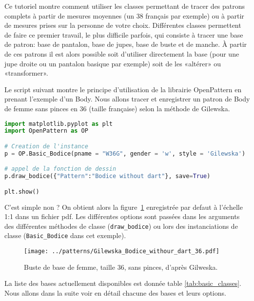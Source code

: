 \documentclass[10pt,a4paper,twoside]{report}
\begin{document}
Ce tutoriel montre comment utiliser les classes permettant de tracer des patrons complets à partir de mesures moyennes (un 38 français par exemple) ou à partir de mesures prises sur la personne de votre choix.
Différentes classes permettent de faire ce premier travail, le plus difficile parfois, qui consiste à tracer une base de patron:  base de pantalon, base de jupes, base de buste et de manche. À partir de ces patrons  il est alors  possible soit d'utiliser directement la base (pour une jupe droite ou un pantalon basique par exemple) soit de les «altérer» ou «transformer».

Le script suivant montre le principe d'utilisation de la librairie OpenPattern en prenant l'exemple d'un Body.  Nous allons tracer et enregistrer un patron de Body de femme sans pinces en 36 (taille française) selon la méthode de Gilewska.

\begin{lstlisting}[language=python]
import matplotlib.pyplot as plt
import OpenPattern as OP

# Creation de l'instance
p = OP.Basic_Bodice(pname = "W36G", gender = 'w', style = 'Gilewska')

# appel de la fonction de dessin
p.draw_bodice({"Pattern":"Bodice without dart"}, save=True)

plt.show()
\end{lstlisting}

C'est simple non ? On obtient alors la figure~\ref{fig:bodice_WG36} enregistrée par defaut à l'échelle 1:1 dans un fichier pdf. Les différentes options sont passées dans les arguments des différentes méthodes de classe (\texttt{draw\_bodice}) ou lors des instanciations de classe (\texttt{Basic\_Bodice} dans cet exemple).



\begin{figure}[hbtp]
\centering
\texttt{[image: ../patterns/Gilewska\_Bodice\_withour\_dart\_36.pdf]}
\caption{Buste de base de femme, taille 36, sans pinces, d'après Gilweska.}
\label{fig:bodice_WG36}
\end{figure}

La liste des bases actuellement disponibles est donnée table \ref{tab:basic_classes}. Nous allons dans la suite voir en détail chacune des bases et leurs options.
\end{document}
